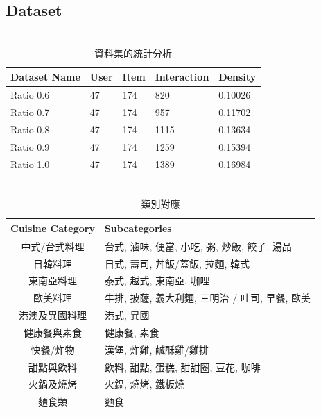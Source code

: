     \subsection{Dataset}
        \begin{table}[h]
            \centering
            \caption{\\ 資料集的統計分析}
            \begin{tabular}{lllll}
            \toprule
            \textbf{Dataset Name} & \textbf{User} & \textbf{Item} & \textbf{Interaction} & \textbf{Density} \\
            \hline
            Ratio 0.6 & 47 & 174 & 820 & 0.10026 \\
            \hline
            Ratio 0.7 & 47 & 174 & 957 & 0.11702 \\
            \hline
            Ratio 0.8 & 47 & 174 & 1115 & 0.13634 \\
            \hline
            Ratio 0.9 & 47 & 174 & 1259 & 0.15394 \\
            \hline
            Ratio 1.0 & 47 & 174 & 1389 & 0.16984 \\
            \hline
            \end{tabular}
            \label{table2}
        \end{table}
        \begin{table}[h]
            \centering
            \caption{\\ 類別對應}
            \renewcommand{\arraystretch}{1.5}
            \begin{tabular}{|c|p{}|}
            \hline
            \textbf{Cuisine Category} & \textbf{Subcategories} \\
            \hline
            {中式/台式料理} & 台式, 滷味, 便當, 小吃, 粥, 炒飯, \newline 餃子, 湯品 \\
            \hline
            日韓料理 & 日式, 壽司, 丼飯/蓋飯, 拉麵, 韓式 \\
            \hline
            東南亞料理 & 泰式, 越式, 東南亞, 咖哩 \\
            \hline
            歐美料理 & 牛排, 披薩, 義大利麵, 三明治 / 吐司, \newline 早餐, 歐美 \\
            \hline
            港澳及異國料理 & 港式, 異國 \\
            \hline
            健康餐與素食 & 健康餐, 素食 \\
            \hline
            快餐/炸物 & 漢堡, 炸雞, 鹹酥雞/雞排 \\
            \hline
            甜點與飲料 & 飲料, 甜點, 蛋糕, 甜甜圈, 豆花, 咖啡 \\
            \hline
            火鍋及燒烤 & 火鍋, 燒烤, 鐵板燒 \\
            \hline
            麵食類 & 麵食 \\
            \hline
            \end{tabular}
            \label{table3}
        \end{table}
        
